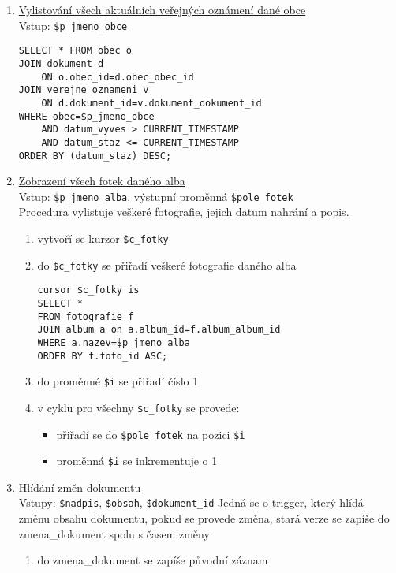 \documentclass[12pt]{article}
\begin{document}
\begin{enumerate}
\begin{enumerate}[label*=\arabic*.]
\begin{enumerate}[label*=\arabic*.]
\begin{enumerate}[label=\arabic*)]
				\end{enumerate}
				\item \hyperlink{verejne}{Vylistování všech aktuálních veřejných oznámení dané obce}\\
				Vstup: \verb|$p_jmeno_obce|
				\begin{lstlisting}
SELECT * FROM obec o 
JOIN dokument d 
	ON o.obec_id=d.obec_obec_id 
JOIN verejne_oznameni v 
	ON d.dokument_id=v.dokument_dokument_id
WHERE obec=$p_jmeno_obce 
	AND datum_vyves > CURRENT_TIMESTAMP
	AND datum_staz <= CURRENT_TIMESTAMP
ORDER BY (datum_staz) DESC;
				\end{lstlisting}
			\item \hyperlink{fotky}{Zobrazení všech fotek daného alba}\\
			Vstup: \verb|$p_jmeno_alba|, výstupní proměnná \verb|$pole_fotek|\\
			Procedura vylistuje veškeré fotografie, jejich datum nahrání a popis.
			\begin{enumerate}[label=\arabic*.]
				\item vytvoří se kurzor \verb|$c_fotky|
				\item do \verb|$c_fotky| se přiřadí veškeré fotografie daného alba 
				\begin{lstlisting}
cursor $c_fotky is 
SELECT * 
FROM fotografie f 
JOIN album a on a.album_id=f.album_album_id 
WHERE a.nazev=$p_jmeno_alba
ORDER BY f.foto_id ASC;
				\end{lstlisting}
				\item do proměnné \verb|$i| se přiřadí číslo 1
				\item v cyklu pro všechny \verb|$c_fotky| se provede:
					\begin{itemize}
						\item přiřadí se do \verb|$pole_fotek| na pozici \verb|$i|
						\item proměnná \verb|$i| se inkrementuje o 1
					\end{itemize}
			\end{enumerate}
			\item \hyperlink{5.1.2.2}{Hlídání změn dokumentu} \\
			Vstupy: \verb|$nadpis|, \verb|$obsah|, \verb|$dokument_id|
			Jedná se o trigger, který hlídá změnu obsahu dokumentu, pokud se provede změna, stará verze se zapíše do zmena\_dokument spolu s časem změny
			\begin{enumerate}[label=\arabic*.]
				\item do zmena\_dokument se zapíše původní záznam 

\end{enumerate}
\end{enumerate}
\end{enumerate}
\end{enumerate}
\end{document}

